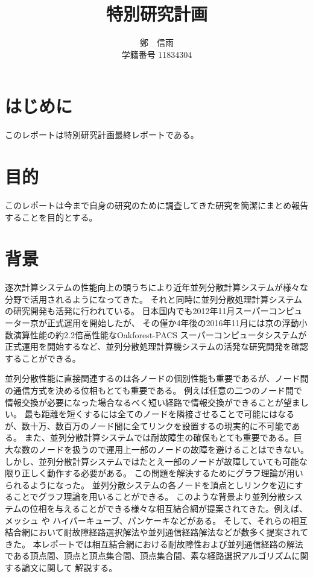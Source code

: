 \documentclass[11pt,a4j]{jsarticle}
\title{特別研究計画 }
\author{鄭　信雨\\学籍番号 11834304}
\theoremstyle{plain}
\begin{document}
\maketitle
\newpage
\tableofcontents
\newpage


 \section{はじめに}
このレポートは特別研究計画最終レポートである。
 \section{目的}
このレポートは今まで自身の研究のために調査してきた研究を簡潔にまとめ報告することを目的とする。
\section{背景}
逐次計算システムの性能向上の頭うちにより近年並列分散計算システムが様々な分野で活用されるようになってきた。
それと同時に並列分散処理計算システムの研究開発も活発に行われている\cite{top500}。
日本国内でも2012年11月スーパーコンピューター京が正式運用を開始したが、
その僅か4年後の2016年11月には京の浮動小数演算性能の約2.2倍高性能なOakforest-PACS スーパーコンピュータシステムが
正式運用を開始するなど、並列分散処理計算機システムの活発な研究開発を確認することができる\cite{kcomputer}\cite{oakforest}。

 並列分散性能に直接関連するのは各ノードの個別性能も重要であるが、ノード間の通信方式を決める位相もとても重要である。
例えば任意の二つのノード間で情報交換が必要になった場合なるべく短い経路で情報交換ができることが望ましい。
最も距離を短くするには全てのノードを隣接させることで可能にはなるが、数十万、数百万のノード間に全てリンクを設置するの現実的に不可能である。
また、並列分散計算システムでは耐故障生の確保もとても重要である。巨大な数のノードを扱うので運用上一部のノードの故障を避けることはできない\cite{diskfailures}。
しかし、並列分散計算システムではたとえ一部のノードが故障していても可能な限り正しく動作する必要がある。
この問題を解決するためにグラフ理論が用いられるようになった。
並列分散システムの各ノードを頂点としリンクを辺にすることでグラフ理論を用いることができる。
このような背景より並列分散システムの位相を与えることができる様々な相互結合網が提案されてきた。例えば、メッシュ や ハイパーキューブ、パンケーキなどがある。
そして、それらの相互結合網において耐故障経路選択解法や並列通信経路解法などが数多く提案されてきた。
本レポートでは相互結合網における耐故障性および並列通信経路の解法である頂点間、頂点と頂点集合間、頂点集合間、素な経路選択アルゴリズムに関する論文に関して
解説する。
\end{document}
